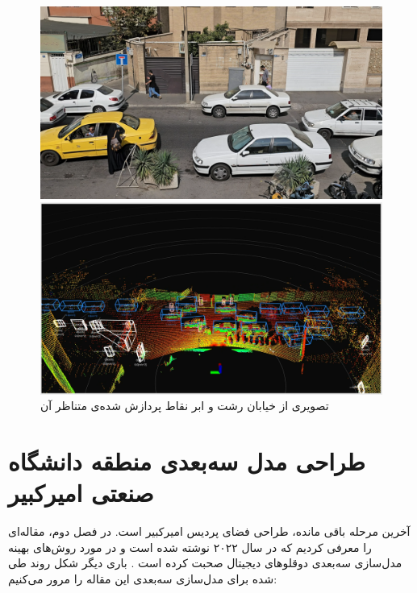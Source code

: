 \begin{figure}[h!]
    \centering
    \begin{minipage}{1\textwidth}
        \includegraphics[width=1\linewidth]{figures/Rasht_Video_Frame_3D_Detection.png}
    \end{minipage}
    \vspace{0.3cm}
    \begin{minipage}{1\textwidth}
        \includegraphics[width=1\linewidth]{figures/Rasht_Calibrated_3D_Detection.png}
    \end{minipage}
    \caption{تصویری از خیابان رشت و ابر نقاط پردازش‌ شده‌ی متناظر آن}
    \label{fig:3D_Detection_Comparison}
\end{figure}

\section{طراحی مدل سه‌بعدی منطقه دانشگاه صنعتی امیرکبیر}

آخرین مرحله باقی‌ مانده، طراحی فضای پردیس امیرکبیر است. در فصل دوم، مقاله‌ای را معرفی کردیم که در سال ۲۰۲۲ نوشته شده است و در مورد روش‌های بهینه مدل‌سازی سه‌بعدی دوقلوهای دیجیتال صحبت کرده است \cite{azfar2022efficient}. باری دیگر شکل روند طی شده برای مدل‌سازی سه‌بعدی این مقاله را مرور می‌کنیم:

